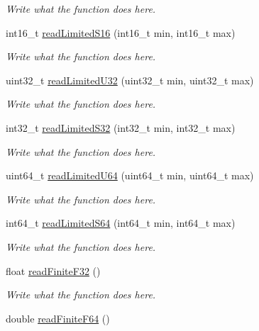 \begin{DoxyCompactItemize}
\begin{DoxyCompactList}\small\item\em Write what the function does here. \end{DoxyCompactList}\item 
int16\+\_\+t \hyperlink{classReader_a3a5205e13d7346a38e713f00ad121f9b}{read\+Limited\+S16} (int16\+\_\+t min, int16\+\_\+t max)
\begin{DoxyCompactList}\small\item\em Write what the function does here. \end{DoxyCompactList}\item 
uint32\+\_\+t \hyperlink{classReader_a0fae64301d0f834b371f63ec7a14443b}{read\+Limited\+U32} (uint32\+\_\+t min, uint32\+\_\+t max)
\begin{DoxyCompactList}\small\item\em Write what the function does here. \end{DoxyCompactList}\item 
int32\+\_\+t \hyperlink{classReader_a16bf2ac6213966372fd05116fdaf7921}{read\+Limited\+S32} (int32\+\_\+t min, int32\+\_\+t max)
\begin{DoxyCompactList}\small\item\em Write what the function does here. \end{DoxyCompactList}\item 
uint64\+\_\+t \hyperlink{classReader_aba38735bda4f4fe28f865bdecb1b08a4}{read\+Limited\+U64} (uint64\+\_\+t min, uint64\+\_\+t max)
\begin{DoxyCompactList}\small\item\em Write what the function does here. \end{DoxyCompactList}\item 
int64\+\_\+t \hyperlink{classReader_a1b8e2c38eb77a67c210502642827e004}{read\+Limited\+S64} (int64\+\_\+t min, int64\+\_\+t max)
\begin{DoxyCompactList}\small\item\em Write what the function does here. \end{DoxyCompactList}\item 
float \hyperlink{classReader_ab6c81b1aa5d0f44875885bf0c7ffc147}{read\+Finite\+F32} ()
\begin{DoxyCompactList}\small\item\em Write what the function does here. \end{DoxyCompactList}\item 
double \hyperlink{classReader_a6b6d8f3a25c567d29941c496980bce4f}{read\+Finite\+F64} ()

\end{DoxyCompactItemize}
